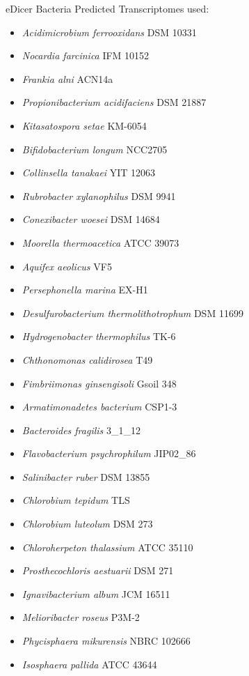     eDicer Bacteria Predicted Transcriptomes used:
\begin{itemize}
    \item \textit{Acidimicrobium ferrooxidans} DSM 10331
    \item \textit{Nocardia farcinica} IFM 10152
    \item \textit{Frankia alni} ACN14a 
    \item \textit{Propionibacterium acidifaciens} DSM 21887
    \item \textit{Kitasatospora setae} KM-6054
    \item \textit{Bifidobacterium longum} NCC2705
    \item \textit{Collinsella tanakaei} YIT 12063 
    \item \textit{Rubrobacter xylanophilus} DSM 9941
    \item \textit{Conexibacter woesei} DSM 14684
    \item \textit{Moorella thermoacetica} ATCC 39073
    \item \textit{Aquifex aeolicus} VF5
    \item \textit{Persephonella marina} EX-H1
    \item \textit{Desulfurobacterium thermolithotrophum} DSM 11699
    \item \textit{Hydrogenobacter thermophilus} TK-6
    \item \textit{Chthonomonas calidirosea} T49
    \item \textit{Fimbriimonas ginsengisoli} Gsoil 348
    \item \textit{Armatimonadetes bacterium} CSP1-3
    \item \textit{Bacteroides fragilis} 3\_1\_12
    \item \textit{Flavobacterium psychrophilum} JIP02\_86
    \item \textit{Salinibacter ruber} DSM 13855
    \item \textit{Chlorobium tepidum} TLS
    \item \textit{Chlorobium luteolum} DSM 273
    \item \textit{Chloroherpeton thalassium} ATCC 35110
    \item \textit{Prosthecochloris aestuarii} DSM 271
    \item \textit{Ignavibacterium album} JCM 16511
    \item \textit{Melioribacter roseus} P3M-2
    \item \textit{Phycisphaera mikurensis} NBRC 102666
    \item \textit{Isosphaera pallida} ATCC 43644

\end{itemize}
